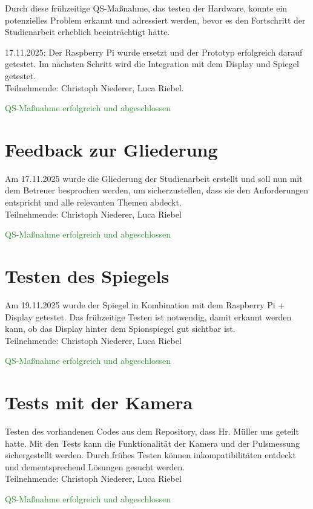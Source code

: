 Durch diese frühzeitige QS-Maßnahme, das testen der Hardware, konnte ein potenzielles Problem erkannt und adressiert werden, bevor es den Fortschritt der Studienarbeit erheblich beeinträchtigt hätte.


17.11.2025: Der Raspberry Pi wurde ersetzt und der Prototyp erfolgreich darauf getestet. Im nächsten Schritt wird die Integration mit dem Display und Spiegel getestet.
\\
Teilnehmende: Christoph Niederer, Luca Riebel.

{\textcolor{ForestGreen}{QS-Maßnahme erfolgreich und abgeschlossen}}

\section{Feedback zur Gliederung}
Am 17.11.2025 wurde die Gliederung der Studienarbeit erstellt und soll nun mit dem Betreuer besprochen werden, um sicherzustellen, dass sie den Anforderungen entspricht und alle relevanten Themen abdeckt.
\\
Teilnehmende: Christoph Niederer, Luca Riebel

{\textcolor{ForestGreen}{QS-Maßnahme erfolgreich und abgeschlossen}}

\section{Testen des Spiegels}
Am 19.11.2025 wurde der Spiegel in Kombination mit dem Raspberry Pi + Display getestet. Das frühzeitige Testen ist notwendig, damit erkannt werden kann, ob das Display hinter dem Spionspiegel gut sichtbar ist.
\\
Teilnehmende: Christoph Niederer, Luca Riebel

{\textcolor{ForestGreen}{QS-Maßnahme erfolgreich und abgeschlossen}}

\section{Tests mit der Kamera}
Testen des vorhandenen Codes aus dem Repository, dass Hr. Müller uns geteilt hatte. Mit den Tests kann die Funktionalität der Kamera und der Pulsmessung sichergestellt werden. Durch frühes Testen können inkompatibilitäten entdeckt und dementsprechend Lösungen gesucht werden.
\\
Teilnehmende: Christoph Niederer, Luca Riebel

{\textcolor{ForestGreen}{QS-Maßnahme erfolgreich und abgeschlossen}}